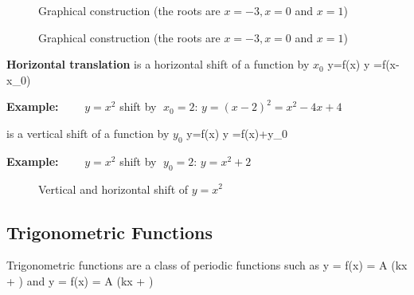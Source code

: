 \vs\vs\begin{figure}[!h]
\centering {}
\hspace*{0.5cm}%
 \svs 
\caption{Graphical construction (the roots are $x=-3, x=0$ and $x=1$)} \label{fig9}
\end{figure}

\begin{figure}[!h]
\centering {}
\hspace*{0.5cm}%
 \svs 
\caption{Graphical construction (the roots are $x=-3, x=0$ and $x=1$)} \label{fig9}
\end{figure} 

\newpage

{\bf Horizontal translation} is a horizontal shift of a function by $x_0$
\bnn y=f(x) \; \rightarrow \; y =f(x-x_0) \enn

{\bf Example:} $\qquad y = x^2$  \; shift by $\; x_0=2$: \; $ y = (x-2)^2 = x^2 - 4x +4$  \vs

 is a vertical shift of a function by $y_0$
\bnn y=f(x) \; \rightarrow \; y =f(x)+y_0 \enn

{\bf Example:} $\qquad y=x^2$ \; shift by $\; y_0=2$: \;  $ y=x^2+2 $ \vs

\vs\begin{figure}[!h]
\centering {} 
\hspace*{0.5cm}
 \svs 
\caption{Vertical and horizontal shift of $y=x^2$} \label{fig11}
\end{figure}

\subsection{Trigonometric Functions}
Trigonometric functions are a class of periodic functions such as
\bnn y = f(x) = A \sin(kx + \phi) \quad \mbox{and} \quad
     y = f(x) = A \cos(kx + \phi) \enn

